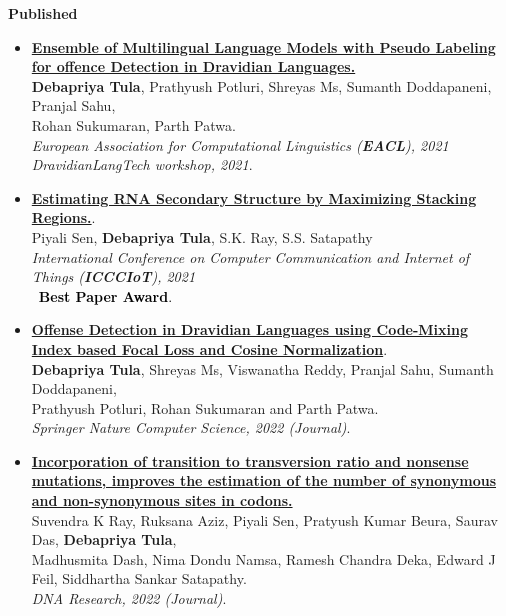 \documentclass[10pt]{article}
\begin{document}
\textbf{\large{Published}}
\begin{itemize} \itemsep-0.05em
    \item \href{https://www.aclweb.org/anthology/2021.dravidianlangtech-1.42}{\textbf{Ensemble of Multilingual Language Models with Pseudo Labeling for offence Detection in Dravidian Languages.}}\\
    \textbf{Debapriya Tula}, Prathyush Potluri, Shreyas Ms, Sumanth Doddapaneni, Pranjal Sahu, \\Rohan Sukumaran, Parth Patwa.\\
    \emph{European Association for Computational Linguistics (\textbf{EACL}), 2021}\\
    \emph{DravidianLangTech workshop, 2021}.
    
    \item \href{https://doi.org/10.1007/978-981-15-6198-6_15}{\textbf{Estimating RNA Secondary Structure by Maximizing Stacking Regions.}}.\\
    Piyali Sen, \textbf{Debapriya Tula}, S.K. Ray, S.S. Satapathy \\
    \emph{International Conference on Computer Communication and Internet of Things (\textbf{ICCCIoT}), 2021} \\
    \faTrophy \textcolor{black}{~\textbf{Best Paper Award}.}
    
    \item \href{https://link.springer.com/article/10.1007/s42979-022-01190-1}{\textbf{Offense Detection in Dravidian Languages using Code-Mixing Index based Focal Loss and Cosine Normalization}}.\\
    \textbf{Debapriya Tula}, Shreyas Ms, Viswanatha Reddy, Pranjal Sahu, Sumanth Doddapaneni, \\Prathyush Potluri, Rohan Sukumaran and Parth Patwa.\\
    \emph{Springer Nature Computer Science, 2022 (Journal)}.
    
    \item \href{https://pubmed.ncbi.nlm.nih.gov/35920776/}{\textbf{Incorporation of transition to transversion ratio and nonsense mutations, improves the estimation of the number of synonymous and non-synonymous sites in codons.}}\\
    Suvendra K Ray, Ruksana Aziz, Piyali Sen, Pratyush Kumar Beura, Saurav Das, \textbf{Debapriya Tula}, \\
    Madhusmita Dash, Nima Dondu Namsa, Ramesh Chandra Deka, Edward J Feil, Siddhartha Sankar Satapathy.\\
    \emph{DNA Research, 2022 (Journal)}.

\end{itemize}
\vspace{-1.5mm}
\end{document}
